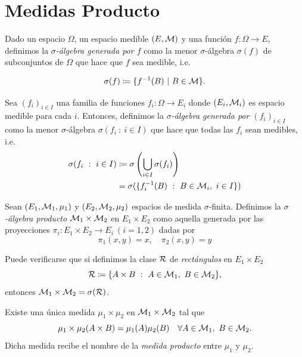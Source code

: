 
\section{Medidas Producto}

\begin{definition}
	Dado un espacio $\Omega$, un espacio medible $(E, \mathcal{M})$ y una función $f \colon \Omega  \to E$, definimos la \textit{$\sigma$-álgebra generada por $f$} como la menor $\sigma$-álgebra $\sigma(f)$ de subconjuntos de $\Omega$ que hace que $f$ sea medible, i.e.

	\[ \sigma(f) \coloneq \{f^{-1}(B) \ | \ B \in \mathcal{M}\}. \] 

	Sea $(f_{i})_{i \in I}$ una familia de funciones $f_{i} \colon \Omega \to E_{i}$ donde $(E_{i}, \mathcal{M}_{i})$ es espacio medible para cada $i$. Entonces, definimos la \textit{$\sigma$-álgebra generada por $(f_{i})_{i \in I}$} como la menor $\sigma$-álgebra $\sigma(f_{i} \ : \ i \in I)$ que hace que todas las $f_{i}$ sean medibles, i.e.
	\begin{align*}
		\sigma(f_{i} \ : \ i \in I) &\coloneq \sigma\left(\bigcup_{i \in I} \sigma(f_{i})\right) \\
		&= \sigma(\{f_{i}^{-1}(B) \ : \ B \in \mathcal{M}_{i},\ i \in I\}) \\
	\end{align*}
\end{definition}

\begin{definition}
	Sean $(E_{1}, \mathcal{M}_{1}, \mu_{1})$ y $(E_{2}, \mathcal{M}_{2}, \mu_{2})$ espacios de medida $\sigma$-finita. Definimos la \textit{$\sigma$-álgebra producto} $\mathcal{M}_{1} \times \mathcal{M}_{2}$ en $E_{1} \times E_{2}$ como aquella generada por las proyecciones $\pi_{i} \colon E_{1} \times E_{2} \to E_{i} \ (i = 1,2)$ dadas por
	\[ \pi_{1}(x,y) = x, \quad \pi_{2}(x,y) = y \]
\end{definition}

\begin{note}
	Puede verificarse que si definimos la clase $\mathcal{R}$ de \textit{rectángulos} en $E_{1} \times E_{2}$
	\[ \mathcal{R} \coloneq \{A \times B \ : \ A \in \mathcal{M}_{1}, \ B \in \mathcal{M}_{2}\}, \]
	entonces $\mathcal{M}_{1} \times \mathcal{M}_{2} = \sigma(\mathcal{R})$.
\end{note}

\begin{theorem}
	Existe una única medida $\mu_{1} \times \mu_{2}$ en $\mathcal{M}_{1} \times \mathcal{M}_{2}$ tal que 
	\[ \mu_{1} \times \mu_{2} (A \times B) = \mu_{1}(A) \mu_{2}(B) \quad \forall A \in \mathcal{M}_{1},\ B \in \mathcal{M}_{2}. \]
	Dicha medida recibe el nombre de la \textit{medida producto} entre $\mu_{1}$ y $\mu_{2}$.
\end{theorem}

